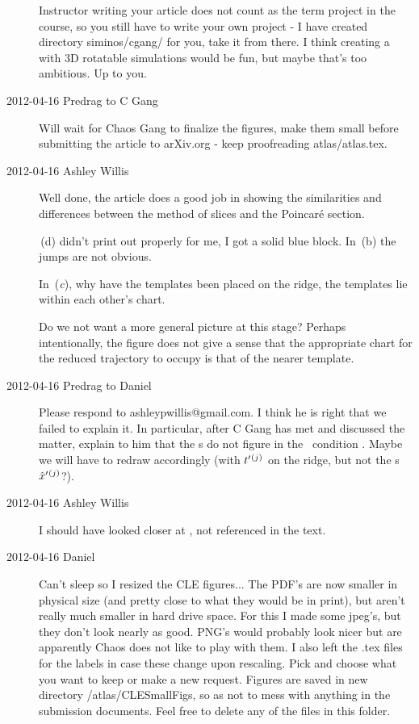 \begin{description}
Instructor writing your article does not count as the term project in the
course, so you still have to write your own project - I have created
directory siminos/cgang/ for you, take it from there. I think creating a
 with 3D rotatable
simulations would be fun, but maybe that's too ambitious. Up to you.


\item[2012-04-16 Predrag to C Gang]
Will wait for Chaos Gang to finalize the figures, make them small before
submitting the article to arXiv.org - keep proofreading atlas/atlas.tex.

\item[2012-04-16 Ashley Willis] Well done, the article does a good job in
showing the similarities and differences between the method of slices and
the Poincar\'e section.

\,(d) didn't print out properly for me, I got a
solid blue block.  In \,(b) the jumps are not
obvious.

In \,({\it c}), why have the templates been
placed on the ridge, the templates lie within each other's chart.

Do we not want a more general picture at this stage?  Perhaps
intentionally, the figure does not give a sense that the appropriate chart for
the reduced trajectory to occupy is that of the nearer template.

\item[2012-04-16 Predrag to Daniel] Please respond to
ashleypwillis@gmail.com. I think he is right that we failed to explain
it. In particular, after C Gang has met and discussed the matter, explain
to him that the \template s do not figure in the \slice\ condition
. Maybe we will have to redraw 
accordingly (with $t'_{}{}^{(j)}$ on the ridge, but not the
\template s\ ${\hat{x}'}{}^{(j)}$?).

\item[2012-04-16 Ashley Willis] I should have looked closer at
, not referenced in the text.

\item[2012-04-16 Daniel]
Can't sleep so I resized the CLE figures... The PDF's are now smaller in
physical size (and pretty close to what they would be in print), but
aren't really much smaller in hard drive space. For this I made some
jpeg's, but they don't look nearly as good. PNG's would probably look
nicer but are apparently Chaos does not like to play with them. I also
left the .tex files for the labels in case these change upon rescaling.
Pick and choose what you want to keep or make a new request. Figures are
saved in new directory /atlas/CLESmallFigs, so as not to mess with
anything in the submission documents. Feel free to delete any of the
files in this folder.


\end{description}
